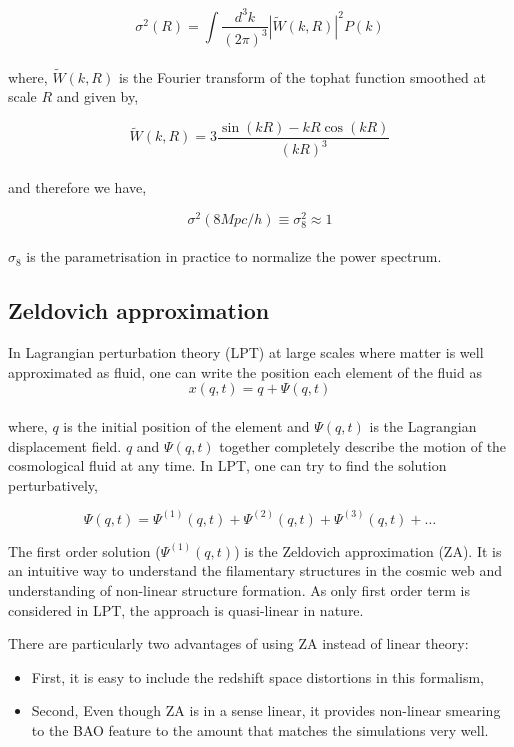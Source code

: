 \begin{equation}
	\sigma^2(R) = \int \dfrac{d^3k}{(2\pi)^3} |\tilde{W}(k,R)|^2 P(k)
\end{equation}
\\
where, $\tilde{W}(k,R)$ is the Fourier transform of the tophat function smoothed 
at scale $R$ and given by,

\begin{equation}
	\tilde{W}(k,R) = 3\dfrac{\sin(kR) - kR \cos(kR)}{(kR)^3}
\end{equation}
\\
and therefore we have,

\begin{equation}
	\sigma^2(8 Mpc/h) \equiv \sigma_8^2 \approx 1
\end{equation}
\\
$\sigma_8$ is the parametrisation in practice to normalize the power
spectrum. 

\subsection{Zeldovich approximation}

In Lagrangian perturbation theory (LPT) \cite{} at large scales where matter is
well approximated as fluid, one can write the position each element of the fluid as
\begin{equation}
	x(q,t) = q + \Psi(q,t)
\end{equation}
\\
where, $q$ is the initial position of the element and $\Psi(q,t)$ is the Lagrangian
displacement field. $q$ and $\Psi(q,t)$ together completely describe the motion
of the cosmological fluid at any time. In LPT, one can try to find the solution 
perturbatively,

\begin{equation}
	\Psi(q,t) = \Psi^{(1)}(q,t)+\Psi^{(2)}(q,t)+\Psi^{(3)}(q,t)+\dots
\end{equation}

The first order solution ($\Psi^{(1)}(q,t)$) is the Zeldovich approximation (ZA). It
is an intuitive way to understand the filamentary structures in the cosmic web 
and understanding of non-linear structure formation. As only first order term
is considered in LPT, the approach is quasi-linear in nature.

There are particularly two advantages of using ZA instead of linear theory:

\begin{itemize}
	\item First, it is easy to include the redshift space distortions in this formalism,
	\item Second, Even though ZA is in a sense linear, it provides non-linear smearing
	to the BAO feature to the amount that matches the simulations very well. 
\end{itemize}

